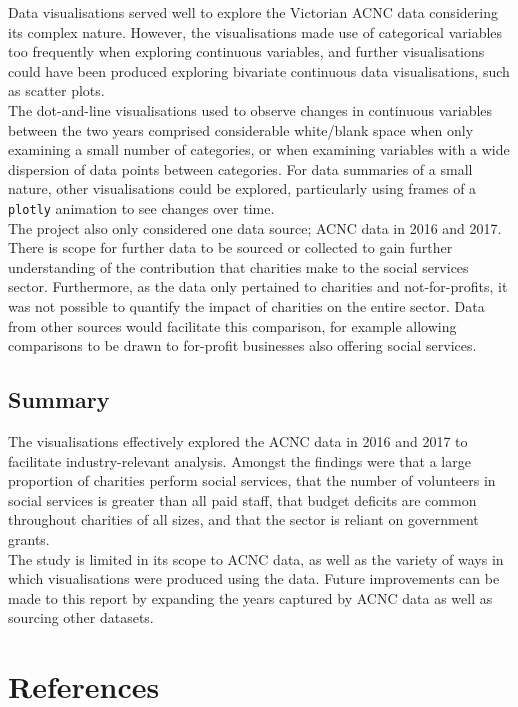 \documentclass[
  11pt,
]{article}
\begin{document}
Data visualisations served well to explore the Victorian ACNC data considering its complex nature. However, the visualisations made use of categorical variables too frequently when exploring continuous variables, and further visualisations could have been produced exploring bivariate continuous data visualisations, such as scatter plots.\\
The dot-and-line visualisations used to observe changes in continuous variables between the two years comprised considerable white/blank space when only examining a small number of categories, or when examining variables with a wide dispersion of data points between categories. For data summaries of a small nature, other visualisations could be explored, particularly using frames of a \texttt{plotly} animation to see changes over time.\\
The project also only considered one data source; ACNC data in 2016 and 2017. There is scope for further data to be sourced or collected to gain further understanding of the contribution that charities make to the social services sector. Furthermore, as the data only pertained to charities and not-for-profits, it was not possible to quantify the impact of charities on the entire sector. Data from other sources would facilitate this comparison, for example allowing comparisons to be drawn to for-profit businesses also offering social services.

\hypertarget{summary}{%
\subsection{Summary}\label{summary}}

The visualisations effectively explored the ACNC data in 2016 and 2017 to facilitate industry-relevant analysis. Amongst the findings were that a large proportion of charities perform social services, that the number of volunteers in social services is greater than all paid staff, that budget deficits are common throughout charities of all sizes, and that the sector is reliant on government grants.\\
The study is limited in its scope to ACNC data, as well as the variety of ways in which visualisations were produced using the data. Future improvements can be made to this report by expanding the years captured by ACNC data as well as sourcing other datasets.

\newpage
{}
\onecolumn

\hypertarget{references}{%
\section{References}\label{references}}
\end{document}
